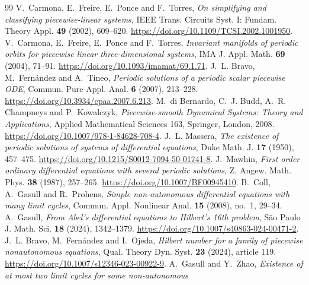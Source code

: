 \documentclass[11pt,a4paper]{article}
\begin{document}
\clearpage
\begin{thebibliography}{99}
V.~Carmona, E.~Freire, E.~Ponce and F.~Torres,
\emph{On simplifying and classifying piecewise-linear systems},
IEEE Trans. Circuits Syst. I: Fundam. Theory Appl. \textbf{49} (2002), 609--620.
\href{https://doi.org/10.1109/TCSI.2002.1001950}{https://doi.org/10.1109/TCSI.2002.1001950}.
V.~Carmona, E.~Freire, E.~Ponce and F.~Torres,
\emph{Invariant manifolds of periodic orbits for piecewise linear
three-dimensional systems}, IMA J. Appl. Math. \textbf{69} (2004), 71--91.
\href{https://doi.org/10.1093/imamat/69.1.71}{https://doi.org/10.1093/imamat/69.1.71}.
J.~L. Bravo, M.~Fern\'andez and A.~Tineo,
\emph{Periodic solutions of a periodic scalar piecewise ODE},
Commun. Pure Appl. Anal. \textbf{6} (2007), 213--228.
\href{https://doi.org/10.3934/cpaa.2007.6.213}{https://doi.org/10.3934/cpaa.2007.6.213}.
M.~di Bernardo, C.~J. Budd, A.~R. Champneys and P.~Kowalczyk,
\emph{Piecewise-smooth Dynamical Systems: Theory and Applications},
Applied Mathematical Sciences 163, Springer, London, 2008.
\href{https://doi.org/10.1007/978-1-84628-708-4}{https://doi.org/10.1007/978-1-84628-708-4}.
J.~L. Massera,
\emph{The existence of periodic solutions of systems of differential equations},
Duke Math. J. \textbf{17} (1950), 457--475.
\href{https://doi.org/10.1215/S0012-7094-50-01741-8}{https://doi.org/10.1215/S0012-7094-50-01741-8}.
J.~Mawhin,
\emph{First order ordinary differential equations with several periodic solutions},
Z. Angew. Math. Phys. \textbf{38} (1987), 257--265.
\href{https://doi.org/10.1007/BF00945410}{https://doi.org/10.1007/BF00945410}.
B.~Coll, A.~Gasull and R.~Prohens,
\emph{Simple non-autonomous differential equations with many limit cycles},
Commun. Appl. Nonlinear Anal. \textbf{15} (2008), no.~1, 29--34.
A.~Gasull,
\emph{From Abel's differential equations to Hilbert's 16th problem},
S\~ao Paulo J. Math. Sci. \textbf{18} (2024), 1342--1379.
\href{https://doi.org/10.1007/s40863-024-00471-2}{https://doi.org/10.1007/s40863-024-00471-2}.
J.~L. Bravo, M.~Fern\'andez and I.~Ojeda,
\emph{Hilbert number for a family of piecewise nonautonomous equations},
Qual. Theory Dyn. Syst. \textbf{23} (2024), article 119.
\href{https://doi.org/10.1007/s12346-023-00922-9}{https://doi.org/10.1007/s12346-023-00922-9}.
A.~Gasull and Y.~Zhao,
\emph{Existence of at most two limit cycles for some non-autonomous
}
\end{thebibliography}
\end{document}
